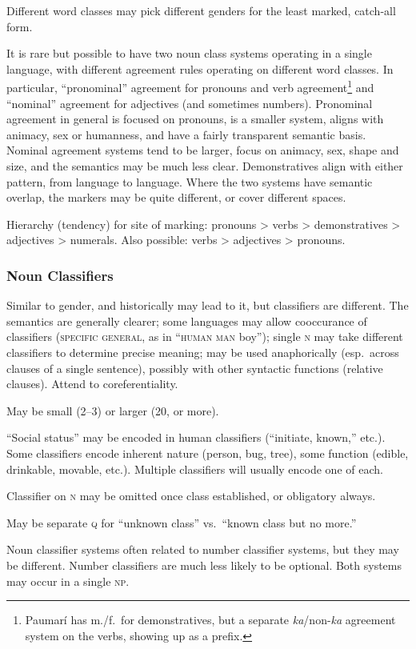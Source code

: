 \documentclass[11pt]{article}
\newcommand{\I}[1]{\textsc{#1}}   %
\begin{document}
Different word classes may pick different genders for the least
marked, catch-all form.

It is rare but possible to have two noun class systems operating in a
single language, with different agreement rules operating on different
word classes.  In particular, ``pronominal'' agreement for pronouns
and verb agreement\footnote{Paumarí has m./f.\ for demonstratives, but
a separate \textit{ka}/non-\textit{ka} agreement system on the
verbs, showing up as a prefix.} and ``nominal'' agreement for
adjectives (and sometimes numbers).  Pronominal agreement in general
is focused on pronouns, is a smaller system, aligns with animacy, sex
or humanness, and have a fairly transparent semantic basis.  Nominal
agreement systems tend to be larger, focus on animacy, sex, shape and
size, and the semantics may be much less clear.  Demonstratives align
with either pattern, from language to language.  Where the two systems
have semantic overlap, the markers may be quite different, or cover
different spaces.

Hierarchy (tendency) for site of marking: pronouns > verbs >
demonstratives > adjectives > numerals. Also possible: verbs >
adjectives > pronouns.

\subsubsection{Noun Classifiers}
Similar to gender, and historically may lead to it, but classifiers
are different.  The semantics are generally clearer; some languages
may allow cooccurance of classifiers (\I{specific general}, as in
``\I{human man} boy''); single \I{n} may take different classifiers to
determine precise meaning; may be used anaphorically (esp.\ across
clauses of a single sentence), possibly with other syntactic functions
(relative clauses).  Attend to coreferentiality.

May be small (2--3) or larger (20, or more).

``Social status'' may be encoded in human classifiers (``initiate,
known,'' etc.).  Some classifiers encode inherent nature (person, bug,
tree), some function (edible, drinkable, movable, etc.).  Multiple
classifiers will usually encode one of each.

Classifier on \I{n} may be omitted once class established, or
obligatory always.

May be separate \I{q} for ``unknown class'' vs.\ ``known class but no
more.'' 

Noun classifier systems often related to number classifier systems,
but they may be different.  Number classifiers are much less likely to
be optional.  Both systems may occur in a single \I{np}.
\end{document}
